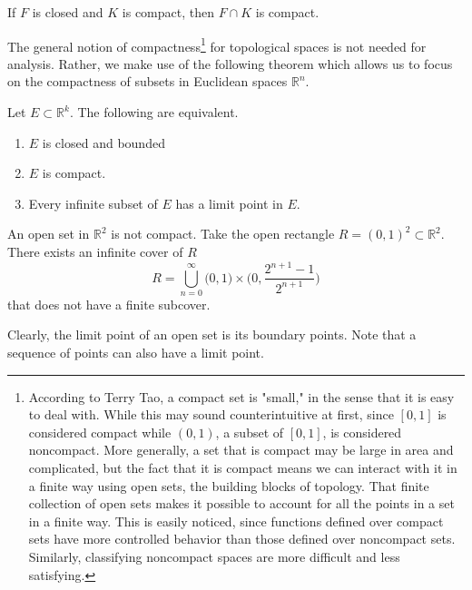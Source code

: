   \begin{corollary}
    If $F$ is closed and $K$ is compact, then $F \cap K$ is compact. 
  \end{corollary}

  The general notion of compactness\footnote{According to Terry Tao, a compact set is "small," in the sense that it is easy to deal with. While this may sound counterintuitive at first, since $[0,1]$ is considered compact while $(0,1)$, a subset of $[0,1]$, is considered noncompact. More generally, a set that is compact may be large in area and complicated, but the fact that it is compact means we can interact with it in a finite way using open sets, the building blocks of topology. That finite collection of open sets makes it possible to account for all the points in a set in a finite way. This is easily noticed, since functions defined over compact sets have more controlled behavior than those defined over noncompact sets. Similarly, classifying noncompact spaces are more difficult and less satisfying. } for topological spaces is not needed for analysis. Rather, we make use of the following theorem which allows us to focus on the compactness of subsets in Euclidean spaces $\mathbb{R}^n$. 

  \begin{theorem}
    Let $E \subset \mathbb{R}^k$. The following are equivalent. 
    \begin{enumerate}
      \item $E$ is closed and bounded 
      \item $E$ is compact. 
      \item Every infinite subset of $E$ has a limit point in $E$. 
    \end{enumerate}
  \end{theorem}

  \begin{example}
    An open set in $\mathbb{R}^2$ is not compact. Take the open rectangle $ R = (0,1)^2 \subset \mathbb{R}^2$. There exists an infinite cover of $R$
    \[R = \bigcup_{n=0}^\infty \big(0,1\big) \times \bigg( 0, \frac{ 2^{n+1} - 1}{2^{n+1}} \bigg) \]
    that does not have a finite subcover. 
  \end{example}

  Clearly, the limit point of an open set is its boundary points. Note that a sequence of points can also have a limit point. 

